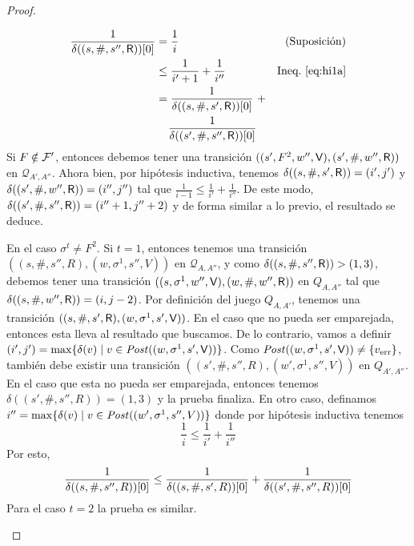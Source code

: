 \begin{proof}
\begin{description}
\begin{align*}
	\frac{1}{\pr{0}{\delta((s,\#, s'', \Refuter))}} & = \frac{1}{i} & \text{(Suposición)} \\
									      & \leq \frac{1}{i'+1} + \frac{1}{i''} & \text{Ineq.~\ref{eq:hi1a}} \\
									      &  = \frac{1}{\pr{0}{\delta((s, \#, s', \Refuter))}} \ +  \\ &\phantom{=\ } \frac{1}{\pr{0}{\delta((s', \#, s'', \Refuter))}} &
\end{align*}
	Si $F \notin \Faults'$, entonces debemos tener una transición $((s', F^2, w'', \Verifier), (s', \#, w'', \Refuter))$ en $\mathcal{Q}_{A',A''}$. 
Ahora bien, por hipótesis inductiva, tenemos $\delta((s, \#, s', \Refuter)) = (i',j')$ y $\delta((s', \#, w'', \Refuter)) = (i'',j'')$ tal que 
$\frac{1}{i-1} \leq \frac{1}{i'} + \frac{1}{i''}$. De este modo, $\delta((s', \#, s'', \Refuter)) = (i''+1, j''+2)$ y de forma similar a lo previo, el resultado se deduce.

	En el caso $\sigma^t \neq F^2$. Si $t=1$, entonces tenemos una transición $((s, \#, s'', R), (w, \sigma^1, s'', V))$ en $\mathcal{Q}_{A,A''}$, y 
	como $\delta((s, \#, s'', \Refuter)) > (1,3)$,
debemos tener una transición $((s, \sigma^1, w'', \Verifier), (w, \#, w'', \Refuter))$ en $Q_{A,A''}$ tal que $\delta((s, \#, w'', \Refuter)) = (i,j-2)$. 
Por definición del juego $Q_{A, A'}$, tenemos una transición
$((s, \#, s', \Refuter), (w, \sigma^1, s', \Verifier))$. En el caso que no pueda ser emparejada, entonces esta lleva al resultado que buscamos. De lo contrario, vamos a definir $(i',j') = \max \{\delta(v) \mid v \in \post((w, \sigma^1, s', \Verifier)) \}$. 
Como $\post((w, \sigma^1, s', \Verifier)) \neq \{\ErrorSt\}$, también debe existir una transición $((s', \#, s'', R), (w', \sigma^1, s'', V))$ en $Q_{A',A''}$. 
En el caso que esta no pueda ser emparejada, entonces tenemos $\delta((s', \#, s'', R)) = (1,3)$ y la prueba finaliza. 
En otro caso, definamos $i'' = \max \{\delta(v) \mid v \in \post((w', \sigma^1, s'', V)) \}$ donde por hipótesis inductiva tenemos
\begin{equation}
	\frac{1}{i} \leq \frac{1}{i'} + \frac{1}{i''}
\end{equation}	
	Por esto, 
\begin{equation}
	\frac{1}{\pr{0}{\delta((s, \#, s'', R))}} \leq \frac{1}{\pr{0}{\delta((s, \#, s', R))}} + \frac{1}{\pr{0}{\delta((s', \#, s'', R))}}
\end{equation}	
	Para el caso $t=2$ la prueba es similar.
\end{description}


\qedhere
\end{proof}\\

